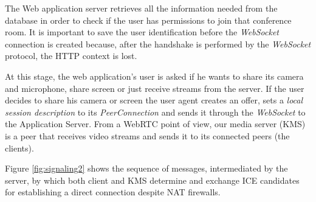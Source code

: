 \documentclass[10pt,conference]{IEEEtran}
\begin{document}
The Web application server retrieves all the information needed from the database in order to check if the user has permissions to join that conference room. 
It is important to save the user identification before the \emph{WebSocket} connection is created because, after the handshake is performed by the \emph{WebSocket} protocol\cite{rfc6455}, the \gls{HTTP} context is lost.

At this stage, the web application's user is asked if he wants to share its camera and microphone, share screen or just receive streams from the server. 
If the user decides to share his camera or screen the user agent creates an offer, sets a \emph{local session description} to its \emph{PeerConnection} and sends it through the \emph{WebSocket} to the Application Server.
From a \gls{WebRTC} point of view, our media server (\gls{KMS}) is a peer that receives video streams and sends it to its connected peers (the clients). 

Figure \ref{fig:signaling2} shows the sequence of messages, intermediated by the server, by which both client and \gls{KMS} determine and exchange \gls{ICE} candidates for establishing a direct connection despite \gls{NAT} firewalls.



\end{document}
